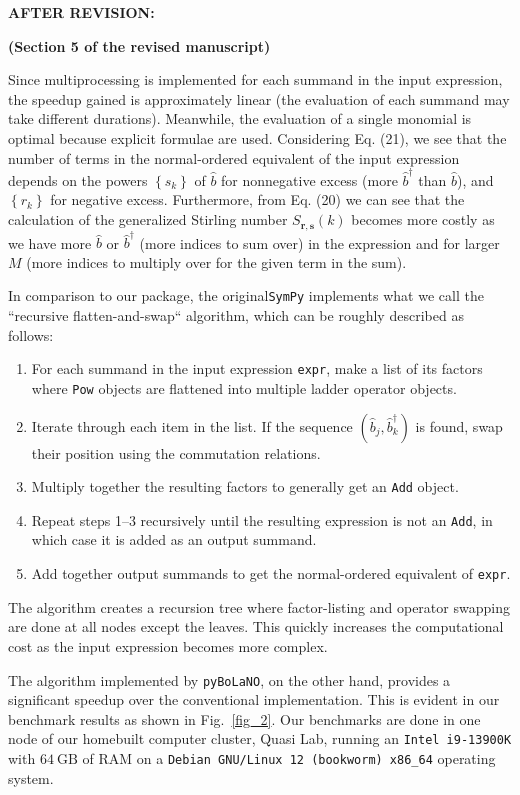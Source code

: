 \documentclass[12pt, a4paper]{article}
\newcommand{\inlinecode}[1]{\texttt{#1}}
\newcommand{\bop}{\hat{b}}
\newcommand{\bdag}{\bop^\dagger}
\newenvironment{revision}{%
\color{red}
}
{}
\newenvironment{revpost}{%
\textbf{{AFTER REVISION:}}
\par
}
{}
\begin{document}
\begin{revpost}

\textbf{(Section 5 of the revised manuscript)}

\begin{revision}Since multiprocessing is implemented for each summand in the input expression, the speedup gained is approximately linear (the evaluation of each summand may take different durations). Meanwhile, the evaluation of a single monomial is optimal because explicit formulae are used. Considering Eq. (21), we see that the number of terms in the normal-ordered equivalent of the input expression depends on the powers $\left\{s_k\right\}$ of $\bop$ for nonnegative excess (more $\bdag$ than $\bop$), and $\left\{r_k\right\}$ for negative excess. Furthermore, from Eq. (20) we can see that the calculation of the generalized Stirling number $S_{\bm{r},\bm{s}}(k)$ becomes more costly as we have more $\bop$ or $\bdag$ (more indices to sum over) in the expression and for larger $M$ (more indices to multiply over for the given term in the sum).

In comparison to our package, the original\texttt{SymPy} implements what we call the ``recursive flatten-and-swap`` algorithm, which can be roughly described as follows:
\begin{enumerate}
    \item For each summand in the input expression \inlinecode{expr}, make a list of its factors where \inlinecode{Pow} objects are flattened into multiple ladder operator objects. 
    \item Iterate through each item in the list. If the sequence $(\bop_j,\bdag_k)$ is found, swap their position using the commutation relations.
    \item Multiply together the resulting factors to generally get an \inlinecode{Add} object.
    \item Repeat steps 1--3 recursively until the resulting expression is not an \inlinecode{Add}, in which case it is added as an output summand. 
    \item Add together output summands to get the normal-ordered equivalent of \inlinecode{expr}.
\end{enumerate}
The algorithm creates a recursion tree where factor-listing and operator swapping are done at all nodes except the leaves. This quickly increases the computational cost as the input expression becomes more complex. 

The algorithm implemented by \texttt{pyBoLaNO}, on the other hand, provides a significant speedup over the conventional implementation. This is evident in our benchmark results as shown in Fig.~\ref{fig_2}. Our benchmarks are done in one node of our homebuilt computer cluster, Quasi Lab, running an \texttt{Intel i9-13900K} with $64\ \mathrm{GB}$ of RAM on a \texttt{Debian GNU/Linux 12 (bookworm) x86\_64} operating system. 


\end{revision}
\end{revpost}
\end{document}
